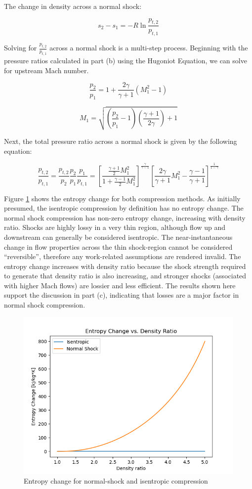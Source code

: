 \documentclass[../main.tex]{subfiles}
\begin{document}
The change in density across a normal shock:

\[
    s_2 - s_1 = -R \ln {\frac{p_{t,2}}{p_{t,1}}}
\]

Solving for \(\frac{p_{t,2}}{p_{t,1}}\) across a normal shock is a multi-step process.
Beginning with the pressure ratios calculated in part (b) using the Hugoniot Equation, we can solve for upstream Mach number.

\[
    \frac{p_2}{p_1} = 1 + \frac{2\gamma}{\gamma+1}\left(M_1^2-1\right)
\]

\[
    M_1 = \sqrt{\left({\frac{p_2}{p_1} - 1}\right)\left({\frac{\gamma+1}{2\gamma}}\right) + 1}
\]

Next, the total pressure ratio across a normal shock is given by the following equation:

\[
    \frac{p_{t,2}}{p_{t,1}} = 
    \frac{p_{t,2}}{p_2} \frac{p_2}{p_1} \frac{p_1}{p_{t,1}} =
    {\left[{
    \frac{\frac{\gamma+1}{2}M_1^2}
    {1 + \frac{\gamma-1}{2}M_1^2}
    }\right]}^ {\frac{\gamma}{\gamma-1}}
    \left[{
    \frac{2\gamma}{\gamma+1}M_1^2 - \frac{\gamma-1}{\gamma+1}
    }\right]^{\frac{1}{1-\gamma}}
\]

Figure \ref{entropy} shows the entropy change for both compression methods.
As initially presumed, the isentropic compression by definition has no entropy change.
The normal shock compression has non-zero entropy change, increasing with density ratio.
Shocks are highly lossy in a very thin region, although flow up and downstream can generally be considered isentropic.
The near-instantaneous change in flow properties across the thin shock-region cannot be considered ``reversible'', therefore any work-related assumptions are rendered invalid.
The entropy change increases with density ratio because the shock strength required to generate that density ratio is also increasing, and stronger shocks (associated with higher Mach flows) are lossier and less efficient.
The results shown here support the discussion in part (c), indicating that losses are a major factor in normal shock compression.

\begin{figure}[h!]
    \centering
    \includegraphics{../../images/problem_1/entropy_change.png}
    \caption{Entropy change for normal-shock and isentropic compression}
    \label{entropy}
\end{figure}
\end{document}
